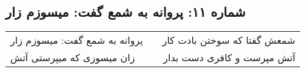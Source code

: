 \begin{center}
\section*{شماره ۱۱: پروانه به شمع گفت: میسوزم زار}
\label{sec:011}
\begin{longtable}{l p{0.5cm} r}
پروانه به شمع گفت: میسوزم زار
&&
شمعش گفتا که سوختن بادت کار
\\
زان میسوزی که میپرستی آتش
&&
آتش مپرست و کافری دست بدار
\\
\end{longtable}
\end{center}
